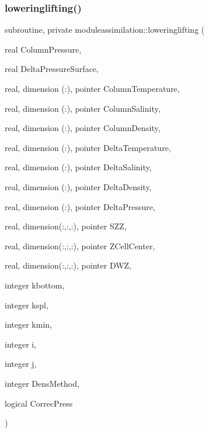 \subsubsection{\texorpdfstring{loweringlifting()}{loweringlifting()}}
{\footnotesize\ttfamily subroutine, private moduleassimilation\+::loweringlifting (\begin{DoxyParamCaption}\item[{real}]{Column\+Pressure,  }\item[{real}]{Delta\+Pressure\+Surface,  }\item[{real, dimension (\+:), pointer}]{Column\+Temperature,  }\item[{real, dimension (\+:), pointer}]{Column\+Salinity,  }\item[{real, dimension (\+:), pointer}]{Column\+Density,  }\item[{real, dimension (\+:), pointer}]{Delta\+Temperature,  }\item[{real, dimension (\+:), pointer}]{Delta\+Salinity,  }\item[{real, dimension (\+:), pointer}]{Delta\+Density,  }\item[{real, dimension (\+:), pointer}]{Delta\+Pressure,  }\item[{real, dimension(\+:,\+:,\+:), pointer}]{S\+ZZ,  }\item[{real, dimension(\+:,\+:,\+:), pointer}]{Z\+Cell\+Center,  }\item[{real, dimension(\+:,\+:,\+:), pointer}]{D\+WZ,  }\item[{integer}]{kbottom,  }\item[{integer}]{kspl,  }\item[{integer}]{kmin,  }\item[{integer}]{i,  }\item[{integer}]{j,  }\item[{integer}]{Dens\+Method,  }\item[{logical}]{Correc\+Press }\end{DoxyParamCaption})\hspace{0.3cm}{\ttfamily [private]}}

